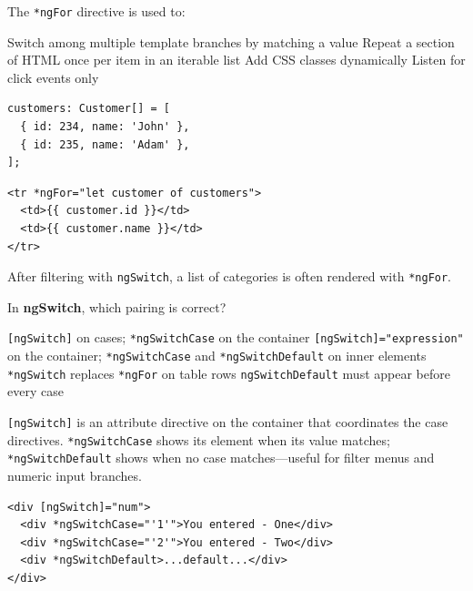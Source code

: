 \question[4]
The \lstinline[style=htmlinline]|*ngFor| directive is used to:
\begin{choices}
  \choice Switch among multiple template branches by matching a value
  \CorrectChoice Repeat a section of HTML once per item in an iterable list
  \choice Add CSS classes dynamically
  \choice Listen for click events only
\end{choices}
\begin{solution}
\begin{lstlisting}[style=ts]
customers: Customer[] = [
  { id: 234, name: 'John' },
  { id: 235, name: 'Adam' },
];
\end{lstlisting}
\begin{lstlisting}[style=htmlinline]
<tr *ngFor="let customer of customers">
  <td>{{ customer.id }}</td>
  <td>{{ customer.name }}</td>
</tr>
\end{lstlisting}
  After filtering with \lstinline[style=htmlinline]|ngSwitch|, a list of categories is often rendered with \lstinline[style=htmlinline]|*ngFor|.
\end{solution}

\question[4]
In \textbf{ngSwitch}, which pairing is correct?
\begin{choices}
  \choice \lstinline[style=htmlinline]|[ngSwitch]| on cases; \lstinline[style=htmlinline]|*ngSwitchCase| on the container
  \CorrectChoice \lstinline[style=htmlinline]|[ngSwitch]="expression"| on the container; \lstinline[style=htmlinline]|*ngSwitchCase| and \lstinline[style=htmlinline]|*ngSwitchDefault| on inner elements
  \choice \lstinline[style=htmlinline]|*ngSwitch| replaces \lstinline[style=htmlinline]|*ngFor| on table rows
  \choice \lstinline[style=htmlinline]|ngSwitchDefault| must appear before every case
\end{choices}
\begin{solution}
  \lstinline[style=htmlinline]|[ngSwitch]| is an attribute directive on the container that coordinates the case directives. \lstinline[style=htmlinline]|*ngSwitchCase| shows its element when its value matches; \lstinline[style=htmlinline]|*ngSwitchDefault| shows when no case matches---useful for filter menus and numeric input branches.
\begin{lstlisting}[style=htmlinline]
<div [ngSwitch]="num">
  <div *ngSwitchCase="'1'">You entered - One</div>
  <div *ngSwitchCase="'2'">You entered - Two</div>
  <div *ngSwitchDefault>...default...</div>
</div>
\end{lstlisting}
\end{solution}

